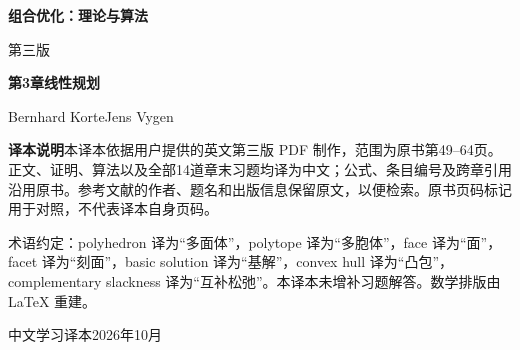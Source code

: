 \documentclass[UTF8,11pt,a4paper,fontset=windows]{ctexart}
\begin{document}
\begin{titlepage}\centering\vspace*{25mm}
{\Huge\bfseries 组合优化：理论与算法\par}\vspace{8mm}
{\Large 第三版\par}\vspace{17mm}
{\LARGE\bfseries 第3章\quad 线性规划\par}\vspace{20mm}
{\large Bernhard Korte\quad Jens Vygen\par}\vfill
\begin{minipage}{0.88\textwidth}\small
\textbf{译本说明}\quad 本译本依据用户提供的英文第三版 PDF 制作，范围为原书第49--64页。正文、证明、算法以及全部14道章末习题均译为中文；公式、条目编号及跨章引用沿用原书。参考文献的作者、题名和出版信息保留原文，以便检索。原书页码标记用于对照，不代表译本自身页码。\par
术语约定：polyhedron 译为“多面体”，polytope 译为“多胞体”，face 译为“面”，facet 译为“刻面”，basic solution 译为“基解”，convex hull 译为“凸包”，complementary slackness 译为“互补松弛”。本译本未增补习题解答。数学排版由 LaTeX 重建。\par
\end{minipage}\vspace{12mm}
{\small 中文学习译本\quad 2026年10月}
\end{titlepage}
\tableofcontents

\end{document}
